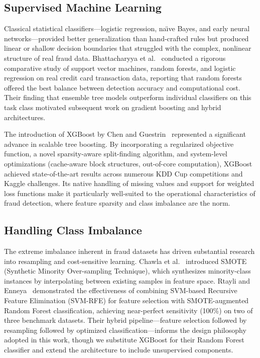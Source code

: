 \documentclass[conference,10pt]{IEEEtran}
\begin{document}
\subsection{Supervised Machine Learning}
Classical statistical classifiers---logistic regression, na\"{\i}ve Bayes, and early neural networks---provided better generalization than hand-crafted rules but produced linear or shallow decision boundaries that struggled with the complex, nonlinear structure of real fraud data. Bhattacharyya et al.~\cite{bhattacharyya2011data} conducted a rigorous comparative study of support vector machines, random forests, and logistic regression on real credit card transaction data, reporting that random forests offered the best balance between detection accuracy and computational cost. Their finding that ensemble tree models outperform individual classifiers on this task class motivated subsequent work on gradient boosting and hybrid architectures.

The introduction of XGBoost by Chen and Guestrin~\cite{chen2016xgboost} represented a significant advance in scalable tree boosting. By incorporating a regularized objective function, a novel sparsity-aware split-finding algorithm, and system-level optimizations (cache-aware block structures, out-of-core computation), XGBoost achieved state-of-the-art results across numerous KDD Cup competitions and Kaggle challenges. Its native handling of missing values and support for weighted loss functions make it particularly well-suited to the operational characteristics of fraud detection, where feature sparsity and class imbalance are the norm.

\subsection{Handling Class Imbalance}
The extreme imbalance inherent in fraud datasets has driven substantial research into resampling and cost-sensitive learning. Chawla et al.~\cite{chawla2002smote} introduced SMOTE (Synthetic Minority Over-sampling Technique), which synthesizes minority-class instances by interpolating between existing samples in feature space. Rtayli and Enneya~\cite{rtayli2020enhanced} demonstrated the effectiveness of combining SVM-based Recursive Feature Elimination (SVM-RFE) for feature selection with SMOTE-augmented Random Forest classification, achieving near-perfect sensitivity (100\%) on two of three benchmark datasets. Their hybrid pipeline---feature selection followed by resampling followed by optimized classification---informs the design philosophy adopted in this work, though we substitute XGBoost for their Random Forest classifier and extend the architecture to include unsupervised components.
\end{document}
